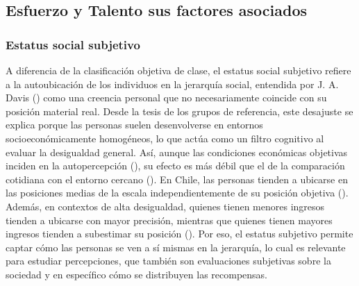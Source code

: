 \documentclass[
  spanish,
  a4paper,
  oneside]{scrbook}
\begin{document}
\subsection{Esfuerzo y Talento sus factores
asociados}\label{esfuerzo-y-talento-sus-factores-asociados}

\subsubsection{Estatus social subjetivo}\label{estatus-social-subjetivo}

A diferencia de la clasificación objetiva de clase, el estatus social
subjetivo refiere a la autoubicación de los individuos en la jerarquía
social, entendida por J. A. Davis
() como una creencia personal que
no necesariamente coincide con su posición material real. Desde la tesis
de los grupos de referencia, este desajuste se explica porque las
personas suelen desenvolverse en entornos socioeconómicamente
homogéneos, lo que actúa como un filtro cognitivo al evaluar la
desigualdad general. Así, aunque las condiciones económicas objetivas
inciden en la autopercepción
(), su efecto es más débil que el de la comparación cotidiana con el
entorno cercano ().
En Chile, las personas tienden a ubicarse en las posiciones medias de la
escala independientemente de su posición objetiva
().
Además, en contextos de alta desigualdad, quienes tienen menores
ingresos tienden a ubicarse con mayor precisión, mientras que quienes
tienen mayores ingresos tienden a subestimar su posición
().
Por eso, el estatus subjetivo permite captar cómo las personas se ven a
sí mismas en la jerarquía, lo cual es relevante para estudiar
percepciones, que también son evaluaciones subjetivas sobre la sociedad
y en específico cómo se distribuyen las recompensas.
\end{document}
